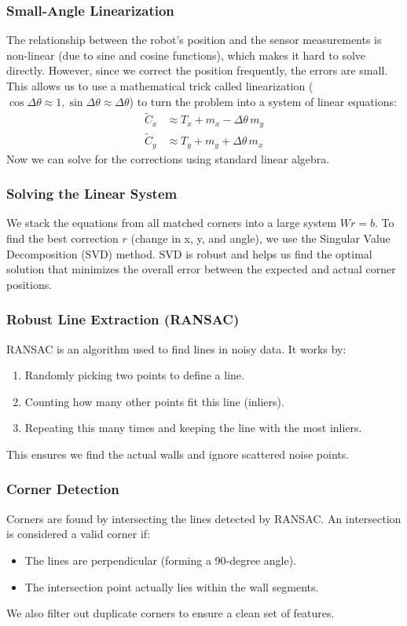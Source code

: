 \documentclass[conference]{IEEEtran}
\begin{document}
\subsubsection{Small-Angle Linearization}
The relationship between the robot's position and the sensor measurements is non-linear (due to sine and cosine functions), which makes it hard to solve directly. However, since we correct the position frequently, the errors are small. This allows us to use a mathematical trick called linearization ($\cos\Delta\theta\approx 1, \sin\Delta\theta\approx \Delta\theta$) to turn the problem into a system of linear equations:
\[
\begin{aligned}
\tilde C_x &\approx T_x + m_x - \Delta\theta\,m_y \\
\tilde C_y &\approx T_y + m_y + \Delta\theta\,m_x
\end{aligned}
\]
Now we can solve for the corrections using standard linear algebra.

\subsubsection{Solving the Linear System}
We stack the equations from all matched corners into a large system $W r = b$. To find the best correction $r$ (change in x, y, and angle), we use the Singular Value Decomposition (SVD) method. SVD is robust and helps us find the optimal solution that minimizes the overall error between the expected and actual corner positions.

\subsubsection{Robust Line Extraction (RANSAC)}
RANSAC is an algorithm used to find lines in noisy data. It works by:
\begin{enumerate}
  \item Randomly picking two points to define a line.
  \item Counting how many other points fit this line (inliers).
  \item Repeating this many times and keeping the line with the most inliers.
\end{enumerate}
This ensures we find the actual walls and ignore scattered noise points.

\subsubsection{Corner Detection}
Corners are found by intersecting the lines detected by RANSAC. An intersection is considered a valid corner if:
\begin{itemize}
  \item The lines are perpendicular (forming a 90-degree angle).
  \item The intersection point actually lies within the wall segments.
\end{itemize}
We also filter out duplicate corners to ensure a clean set of features.
\end{document}
